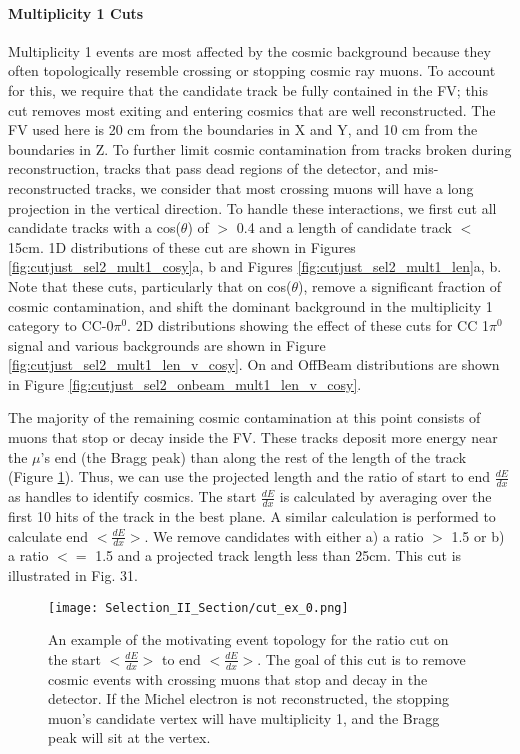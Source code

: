 \paragraph{Multiplicity 1 Cuts}
Multiplicity 1 events are most affected by the cosmic background because they often topologically resemble crossing or stopping cosmic ray muons. To account for this, we require that the candidate track be fully contained in the FV; this cut removes most exiting and entering cosmics that are well reconstructed. The FV used here is 20 cm from the boundaries in X and Y, and 10 cm from the boundaries in Z. To further limit cosmic contamination from tracks broken during reconstruction, tracks that pass dead regions of the detector, and mis-reconstructed tracks, we consider that most crossing muons will have a long projection in the vertical direction.  To handle these interactions, we first cut all candidate tracks with a cos($\theta$) of $>$ 0.4 and a length of candidate track $<$ 15cm. 1D distributions of these cut are shown in Figures \ref{fig:cutjust_sel2_mult1_cosy}a, b and Figures \ref{fig:cutjust_sel2_mult1_len}a, b. Note that these cuts, particularly that on cos($\theta$), remove a significant fraction of cosmic contamination, and shift the dominant background in the multiplicity 1 category to CC-0$\pi^0$. 2D distributions showing the effect of these cuts for CC 1$\pi^0$ signal and various backgrounds are shown in Figure \ref{fig:cutjust_sel2_mult1_len_v_cosy}. On and OffBeam distributions are shown in Figure \ref{fig:cutjust_sel2_onbeam_mult1_len_v_cosy}. 
\par The majority of the remaining cosmic contamination at this point consists of muons that stop or decay inside the FV.  These tracks deposit more energy near the $\mu$'s end (the Bragg peak) than along the rest of the length of the track (Figure \ref{fig:cut_ex_0}). Thus, we can use the projected length and the ratio of start to end $\frac{dE}{dx}$ as handles to identify cosmics. The start $\frac{dE}{dx}$ is calculated by averaging over the first 10 hits of the track in the best plane. A similar calculation is performed to calculate end $<\frac{dE}{dx}>$. We remove candidates with either a) a ratio $>$ 1.5 or b) a ratio $<=$ 1.5 and a projected track length less than 25cm.  This cut is illustrated in Fig. 31.


\begin{figure}[h!]
\centering
\texttt{[image: Selection\_II\_Section/cut\_ex\_0.png]}
\caption{An example of the motivating event topology for the ratio cut on the start $<\frac{dE}{dx}>$ to end $<\frac{dE}{dx}>$.  The goal of this cut is to remove cosmic events with crossing muons that stop and decay in the detector. If the Michel electron is not reconstructed, the stopping muon’s candidate vertex will have multiplicity 1, and the Bragg peak will sit at the vertex. }
\label{fig:cut_ex_0}
\end{figure}

